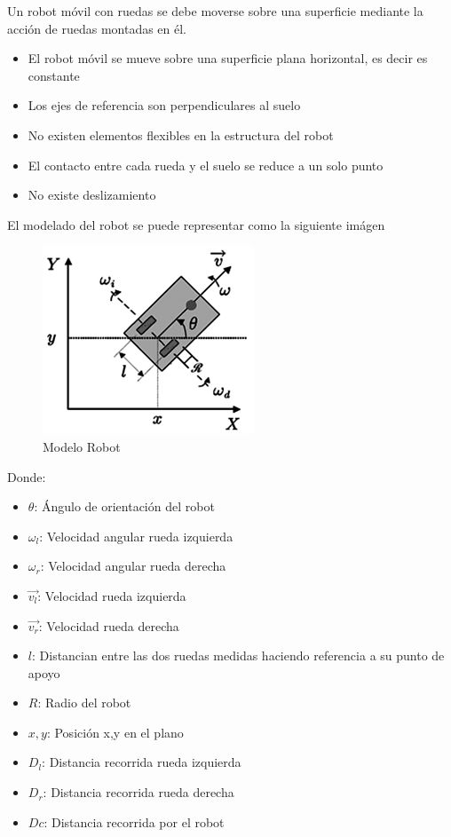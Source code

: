\documentclass[oneside,onecolumn]{article}
\begin{document}
Un robot móvil con ruedas se debe moverse sobre una superficie mediante la acción de ruedas montadas en él.
\begin{itemize}
\item El robot móvil se mueve sobre una superficie plana horizontal, es decir es constante
\item Los ejes de referencia son perpendiculares al suelo
\item No existen elementos flexibles en la estructura del robot
\item El contacto entre cada rueda y el suelo se reduce a un solo punto
\item No existe deslizamiento
\end{itemize}

El modelado del robot se puede representar como la siguiente imágen

\begin{figure}[h]
  \centering
  \includegraphics[scale=0.6]{graficos/odometria.png}
  \caption{Modelo Robot}
\end{figure}

Donde:
\begin{itemize}
\item \textbf{$\theta$}: Ángulo de orientación del robot
\item \textbf{$\omega_{l}$}: Velocidad angular rueda izquierda
\item \textbf{$\omega_{r}$}: Velocidad angular rueda derecha
\item \textbf{$\vec{v_{l}}$}: Velocidad rueda izquierda
\item \textbf{$\vec{v_{r}}$}: Velocidad rueda derecha
\item \textbf{$l$}: Distancian entre las dos ruedas medidas haciendo referencia a su punto de apoyo
\item $R$: Radio del robot
\item $x,y$: Posición x,y en el plano
\item \textbf{$D_{l}$}: Distancia recorrida rueda izquierda
\item \textbf{$D_{r}$}: Distancia recorrida rueda derecha
\item \textbf{$Dc$}: Distancia recorrida por el robot
\end{itemize}
\end{document}
